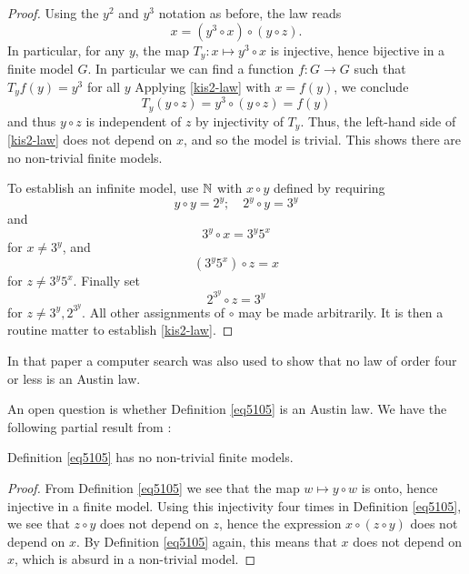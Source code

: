 \begin{proof} Using the $y^2$ and $y^3$ notation as before, the law reads
\begin{equation}\label{kis2-law}
   x = (y^3 \circ x) \circ (y \circ z).
  \end{equation}
In particular, for any $y$, the map $T_y \colon x \mapsto y^3 \circ x$ is injective, hence bijective in a finite model $G$.  In particular we can find a function $f : G \to G$ such that $T_y f(y) = y^3$ for all $y$  Applying \eqref{kis2-law} with $x = f(y)$, we conclude
$$ T_y(y \circ z) = y^3 \circ (y \circ z) = f(y) $$
and thus $y \circ z$ is independent of $z$ by injectivity of $T_y$.  Thus, the left-hand side of \eqref{kis2-law} does not depend on $x$, and so the model is trivial.  This shows there are no non-trivial finite models.

To establish an infinite model, use $\mathbb{N}$ with $x \circ y$ defined by requiring
$$ y \circ y = 2^y; \quad 2^y \circ y = 3^y$$
and
$$ 3^y \circ x = 3^y 5^x$$
for $x \neq 3^y$, and
$$ (3^y 5^x) \circ z = x$$
for $z \neq 3^y 5^x$.  Finally set
$$ 2^{3^y} \circ z = 3^y$$
for $z \neq 3^y, 2^{3^y}$.  All other assignments of $\circ$ may be made arbitrarily. It is then a routine matter to establish \eqref{kis2-law}.
\end{proof}

In that paper a computer search was also used to show that no law of order four or less is an Austin law.

An open question is whether Definition \ref{eq5105} is an Austin law.  We have the following partial result from \cite{Kisielewicz2}:

\begin{theorem}\leanok\label{5105-nontrivial} Definition \ref{eq5105} has no non-trivial finite models.
\end{theorem}

\begin{proof} \leanok From Definition \ref{eq5105} we see that the map $w \mapsto y \circ w$ is onto, hence injective in a finite model.  Using this injectivity four times in Definition \ref{eq5105}, we see that $z \circ y$ does not depend on $z$, hence the expression
$x \circ (z \circ y)$ does not depend on $x$.  By Definition \ref{eq5105} again, this means that $x$ does not depend on $x$, which is absurd in a non-trivial model.
\end{proof}

